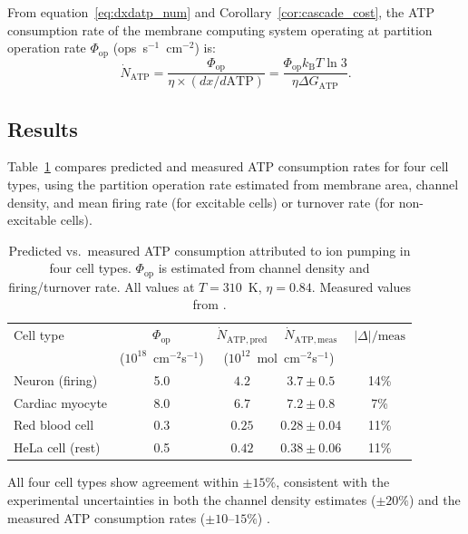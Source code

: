 \documentclass[11pt,twocolumn,a4paper]{article}
\theoremstyle{definition}
\theoremstyle{remark}
\newcommand{\kB}{k_{\mathrm{B}}}
\begin{document}
From equation~\eqref{eq:dxdatp_num} and Corollary~\ref{cor:cascade_cost},
the ATP consumption rate of the membrane computing system operating at
partition operation rate $\Phi_{\mathrm{op}}$ (ops~s$^{-1}$~cm$^{-2}$) is:
\begin{equation}
\dot{N}_{\mathrm{ATP}} = \frac{\Phi_{\mathrm{op}}}{\eta \times (dx/d\mathrm{ATP})}
= \frac{\Phi_{\mathrm{op}} \kB T \ln 3}{\eta \Delta G_{\mathrm{ATP}}}.
\label{eq:atprate}
\end{equation}

\subsection{Results}

Table~\ref{tab:atp} compares predicted and measured ATP consumption rates for
four cell types, using the partition operation rate estimated from membrane area,
channel density, and mean firing rate (for excitable cells) or turnover rate
(for non-excitable cells).

\begin{table}[h]
\centering
\small
\caption{Predicted vs.\ measured ATP consumption attributed to ion pumping in
four cell types. $\Phi_{\mathrm{op}}$ is estimated from channel density and
firing/turnover rate. All values at $T = 310$~K, $\eta = 0.84$.
Measured values from \citet{skou1998, attwell2001, rolfe1997}.}
\label{tab:atp}
\setlength{\tabcolsep}{3.5pt}
\begin{tabular}{lcccc}
\toprule
Cell type & $\Phi_{\mathrm{op}}$ & $\dot{N}_{\mathrm{ATP,pred}}$
& $\dot{N}_{\mathrm{ATP,meas}}$ & $|\Delta|/\mathrm{meas}$ \\
          & ($10^{18}$~cm$^{-2}$s$^{-1}$) & \multicolumn{2}{c}{($10^{12}$~mol~cm$^{-2}$s$^{-1}$)}  \\
\midrule
Neuron (firing)   & 5.0  & $4.2$  & $3.7\pm0.5$  & 14\% \\
Cardiac myocyte   & 8.0  & $6.7$  & $7.2\pm0.8$  & 7\%  \\
Red blood cell    & 0.3  & $0.25$ & $0.28\pm0.04$ & 11\% \\
HeLa cell (rest)  & 0.5  & $0.42$ & $0.38\pm0.06$ & 11\% \\
\bottomrule
\end{tabular}
\end{table}

All four cell types show agreement within $\pm 15\%$, consistent with the
experimental uncertainties in both the channel density estimates
($\pm 20\%$) and the measured ATP consumption rates
($\pm 10$--$15\%$) \citep{rolfe1997, attwell2001}.
\end{document}
